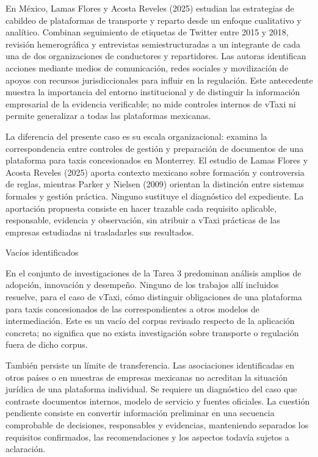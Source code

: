 {En México, Lamas Flores y Acosta Reveles (2025) estudian las estrategias de cabildeo de plataformas de transporte y reparto desde un enfoque cualitativo y analítico. Combinan seguimiento de etiquetas de Twitter entre 2015 y 2018, revisión hemerográfica y entrevistas semiestructuradas a un integrante de cada una de dos organizaciones de conductores y repartidores. Las autoras identifican acciones mediante medios de comunicación, redes sociales y movilización de apoyos con recursos jurisdiccionales para influir en la regulación. Este antecedente muestra la importancia del entorno institucional y de distinguir la información empresarial de la evidencia verificable; no mide controles internos de vTaxi ni permite generalizar a todas las plataformas mexicanas.


La diferencia del presente caso es su escala organizacional: examina la correspondencia entre controles de gestión y preparación de documentos de una plataforma para taxis concesionados en Monterrey. El estudio de Lamas Flores y Acosta Reveles (2025) aporta contexto mexicano sobre formación y controversia de reglas, mientras Parker y Nielsen (2009) orientan la distinción entre sistemas formales y gestión práctica. Ninguno sustituye el diagnóstico del expediente. La aportación propuesta consiste en hacer trazable cada requisito aplicable, responsable, evidencia y observación, sin atribuir a vTaxi prácticas de las empresas estudiadas ni trasladarles sus resultados.


Vacíos identificados


En el conjunto de investigaciones de la Tarea 3 predominan análisis amplios de adopción, innovación y desempeño. Ninguno de los trabajos allí incluidos resuelve, para el caso de vTaxi, cómo distinguir obligaciones de una plataforma para taxis concesionados de las correspondientes a otros modelos de intermediación. Este es un vacío del corpus revisado respecto de la aplicación concreta; no significa que no exista investigación sobre transporte o regulación fuera de dicho corpus.


También persiste un límite de transferencia. Las asociaciones identificadas en otros países o en muestras de empresas mexicanas no acreditan la situación jurídica de una plataforma individual. Se requiere un diagnóstico del caso que contraste documentos internos, modelo de servicio y fuentes oficiales. La cuestión pendiente consiste en convertir información preliminar en una secuencia comprobable de decisiones, responsables y evidencias, manteniendo separados los requisitos confirmados, las recomendaciones y los aspectos todavía sujetos a aclaración.


}
